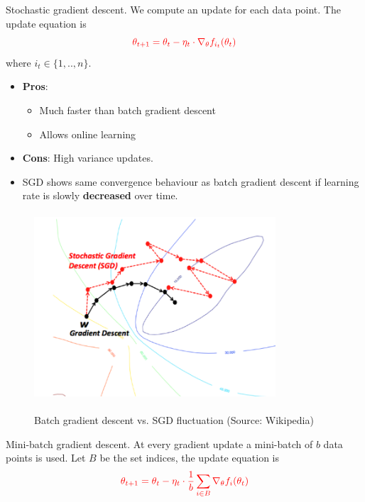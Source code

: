 \documentclass[english]{article}
\begin{document}

\item {Stochastic gradient descent}.
We compute an update for each data point. The update equation is
$$\textcolor{red}{\theta_{t+1} = \theta_t - \eta_t \cdot \nabla_\theta f_{i_t}(\theta_t)}$$
where $i_t \in \{1,.., n\}$.

\begin{itemize}
\item \textbf{Pros}:
\begin{itemize}
\item Much faster than batch gradient descent
\item Allows online learning
\end{itemize}
\item \textbf{Cons}: High variance updates.

\item SGD shows same convergence behaviour as batch gradient descent if
learning rate is slowly \textbf{decreased} over time.
\end{itemize}






\begin{figure}
\begin{center}
\caption{Batch gradient descent vs. SGD fluctuation (Source: Wikipedia)}
\includegraphics[width = 9cm, height = 7cm]{stochastic-vs-batch-gradient-descent.png}
    \label{Batch gradient descent vs. SGD fluctuation}
\end{center}
\end{figure}




\item {Mini-batch gradient descent}.
At every gradient update a mini-batch of $b$ data points is used. Let $B$ be the set indices, the update equation is
$$\textcolor{red}{\theta_{t+1} = \theta_t - \eta_t \cdot \frac1b \sum_{i \in B} \nabla_\theta f_{i}(\theta_t)}$$
\end{document}
